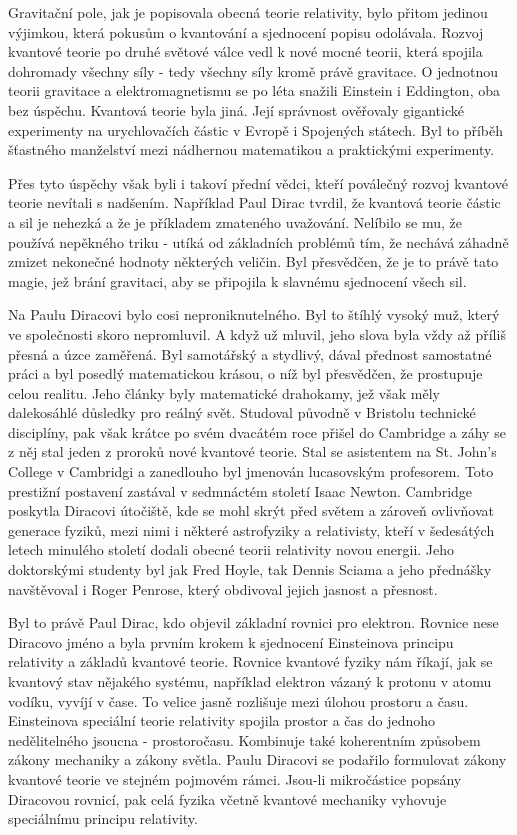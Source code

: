   Gravitační pole, jak je popisovala obecná teorie relativity, bylo přitom jedinou výjimkou, která
  pokusům o kvantování a sjednocení popisu odolávala. Rozvoj kvantové teorie po druhé světové válce
  vedl k nové mocné teorii, která spojila dohromady všechny síly - tedy všechny síly kromě právě
  gravitace. O jednotnou teorii gravitace a elektromagnetismu se po léta snažili Einstein i
  Eddington, oba bez úspěchu. Kvantová teorie byla jiná. Její správnost ověřovaly gigantické
  experimenty na urychlovačích částic v Evropě i Spojených státech. Byl to příběh šťastného
  manželství mezi nádhernou matematikou a praktickými experimenty. 
  
  Přes tyto úspěchy však byli i takoví přední vědci, kteří poválečný rozvoj kvantové teorie nevítali
  s nadšením. Například Paul Dirac tvrdil, že kvantová teorie částic a sil je nehezká a že je
  příkladem zmateného uvažování. Nelíbilo se mu, že používá nepěkného triku - utíká od základních
  problémů tím, že nechává záhadně zmizet nekonečné hodnoty některých veličin. Byl přesvědčen, že je
  to právě tato magie, jež brání gravitaci, aby se připojila k slavnému sjednocení všech sil. 
  
  Na Paulu Diracovi bylo cosi neproniknutelného. Byl to štíhlý vysoký muž, který ve společnosti
  skoro nepromluvil. A když už mluvil, jeho slova byla vždy až příliš přesná a úzce zaměřená. Byl
  samotářský a stydlivý, dával přednost samostatné práci a byl posedlý matematickou krásou, o níž
  byl přesvědčen, že prostupuje celou realitu. Jeho články byly matematické drahokamy, jež však měly
  dalekosáhlé důsledky pro reálný svět. Studoval původně v Bristolu technické disciplíny, pak však
  krátce po svém dvacátém roce přišel do Cambridge a záhy se z něj stal jeden z proroků nové
  kvantové teorie. Stal se asistentem na St. John’s College v Cambridgi a zanedlouho byl jmenován
  lucasovským profesorem. Toto prestižní postavení zastával v sedmnáctém století Isaac Newton.
  Cambridge poskytla Diracovi útočiště, kde se mohl skrýt před světem a zároveň ovlivňovat generace
  fyziků, mezi nimi i některé astrofyziky a relativisty, kteří v šedesátých letech minulého století
  dodali obecné teorii relativity novou energii. Jeho doktorskými studenty byl jak Fred Hoyle, tak
  Dennis Sciama a jeho přednášky navštěvoval i Roger Penrose, který obdivoval jejich jasnost a
  přesnost. 
  
  Byl to právě Paul Dirac, kdo objevil základní rovnici pro elektron. Rovnice nese Diracovo jméno a
  byla prvním krokem k sjednocení Einsteinova principu relativity a základů kvantové teorie. Rovnice
  kvantové fyziky nám říkají, jak se kvantový stav nějakého systému, například elektron vázaný k
  protonu v atomu vodíku, vyvíjí v čase. To velice jasně rozlišuje mezi úlohou prostoru a času.
  Einsteinova speciální teorie relativity spojila prostor a čas do jednoho nedělitelného jsoucna -
  prostoročasu. Kombinuje také koherentním způsobem zákony mechaniky a zákony světla. Paulu Diracovi
  se podařilo formulovat zákony kvantové teorie ve stejném pojmovém rámci. Jsou-li mikročástice
  popsány Diracovou rovnicí, pak celá fyzika včetně kvantové mechaniky vyhovuje speciálnímu principu
  relativity. 
  
